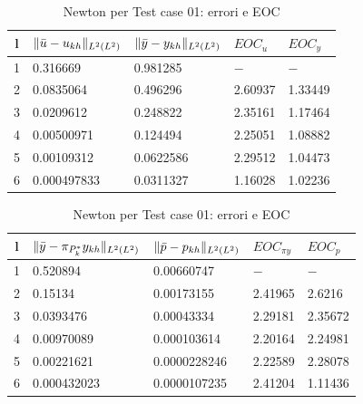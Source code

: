 \begin{table}
\caption{Newton per Test case 01: errori e EOC }
\label{newtonI}
\centering

\begin{tabular}{cllll}
\toprule
{l}           &  {$ \lVert\bar{u}-u_{kh}\rVert_{L^2(L^2)} $} &  {$ \lVert\bar{y}-y_{kh}\rVert_{L^2(L^2)} $} &  {$ EOC_u $} &  {$ EOC_y $} \\
\midrule
1            &  0.316669 &  0.981285 &  {$-$} &  {$-$} \\
2            &  0.0835064 &  0.496296 &  2.60937 &  1.33449 \\
3            &  0.0209612 &  0.248822 &  2.35161 &  1.17464 \\
4            &  0.00500971 &  0.124494  &  2.25051 &  1.08882 \\
5            &  0.00109312 &  0.0622586 &  2.29512 &  1.04473 \\
6            &  0.000497833 &  0.0311327 &  1.16028 &  1.02236 \\
\bottomrule
\end{tabular}              

\end{table}


\begin{table}
\caption{Newton per Test case 01: errori e EOC }
\label{newtonIbis}
\centering

\begin{tabular}{cllll}
\toprule
{l}           &  {$ \lVert\bar{y}-\pi_{P^*_k}y_{kh}\rVert_{L^2(L^2)} $} & {$ \lVert\bar{p}-p_{kh}\rVert_{L^2(L^2)} $} &  {$ EOC_{\pi y} $}  &  {$ EOC_p $} \\
\midrule
1            &  0.520894 &  0.00660747 &  {$-$} &  {$-$} \\
2            &  0.15134 &  0.00173155 &  2.41965 &  2.6216 \\
3            &  0.0393476 &  0.00043334 &  2.29181 &  2.35672 \\
4            &  0.00970089 &  0.000103614 &  2.20164 &  2.24981 \\
5            &  0.00221621 &  0.0000228246 &  2.22589 &  2.28078 \\
6            &  0.000432023 &  0.0000107235 &  2.41204 &  1.11436 \\
\bottomrule
\end{tabular}              

\end{table}

